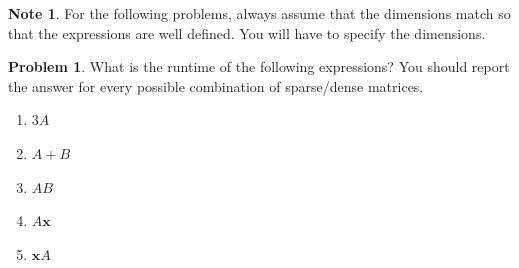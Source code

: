 \documentclass[10pt]{article}
\theoremstyle{definition}
\newtheorem{problem}{Problem}
\newtheorem{note}{Note}
\newcommand{\trans}[1]{{#1}^{T}}
\newcommand{\x}{\mathbf x}
\begin{document}
\begin{note}
For the following problems, always assume that the dimensions match so that the expressions are well defined.
You will have to specify the dimensions.
\end{note}

\begin{problem}
    What is the runtime of the following expressions?
    You should report the answer for every possible combination of sparse/dense matrices.

    \begin{enumerate}
        \item
            $3A$
            \vspace{2in}
        \item
            $A + B$
            \vspace{2in}
        \item
            $AB$
            \vspace{3in}
        \item
            $A\x$
            \vspace{3in}
        \item
            $\x A$
            \vspace{3in}
    \end{enumerate}
\end{problem}

\end{document}
